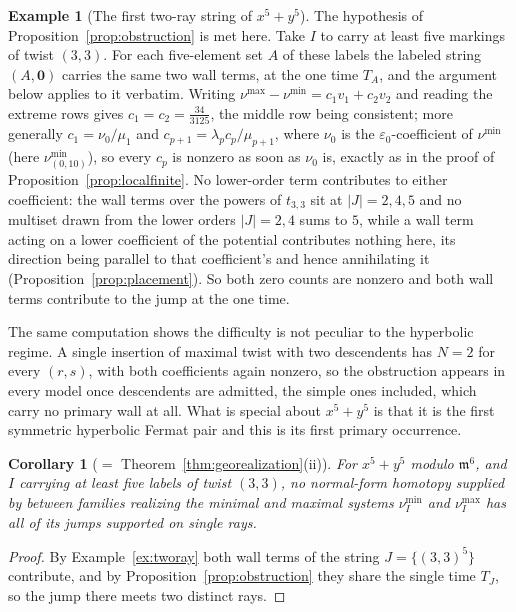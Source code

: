 \documentclass[11pt]{amsart}
\newtheorem{corollary}[theorem]{Corollary}
\theoremstyle{definition}
\newtheorem{example}[theorem]{Example}
\theoremstyle{remark}
\begin{document}
\begin{example}[The first two-ray string of $x^5+y^5$]
The hypothesis of Proposition~\ref{prop:obstruction} is met here. Take $I$ to carry
at least five markings of twist $(3,3)$.  For each five-element set $A$ of these
labels the labeled string $(A,\mathbf 0)$ carries the same two wall terms, at
the one time $T_A$, and the argument below applies to it verbatim. Writing
$\nu^{\max}-\nu^{\min}=c_{1}v_{1}+c_{2}v_{2}$ and reading the extreme rows gives
$c_{1}=c_{2}=\tfrac{34}{3125}$, the middle row being consistent; more generally
$c_{1}=\nu_{0}/\mu_{1}$ and $c_{p+1}=\lambda_{p}c_{p}/\mu_{p+1}$, where $\nu_0$ is
the $\varepsilon_0$-coefficient of $\nu^{\min}$ (here $\nu^{\min}_{(0,10)}$), so
every $c_{p}$ is nonzero as soon as $\nu_{0}$ is, exactly as in the proof of
Proposition~\ref{prop:localfinite}.
No lower-order term contributes to either coefficient: the wall terms over the
powers of $t_{3,3}$ sit at
$|J|=2,4,5$ and no multiset drawn from the lower orders $|J|=2,4$ sums to $5$, while a wall term acting on a lower
coefficient of the potential contributes nothing here, its direction being parallel to
that coefficient's and hence annihilating it (Proposition~\ref{prop:placement}). So both
zero counts are nonzero and both wall terms contribute to the jump at the one time.

The same computation shows the difficulty is not peculiar to the hyperbolic regime. A
single insertion of maximal twist with two descendents has $N=2$ for every $(r,s)$, with
both coefficients again nonzero, so the obstruction appears in every model once
descendents are admitted, the simple ones included, which carry no primary wall at
all. What is special about $x^{5}+y^{5}$ is that it is the first symmetric
hyperbolic Fermat pair and this is its first primary occurrence.
\end{example}

\begin{corollary}[$=$ Theorem~\ref{thm:georealization}(ii)]
\label{cor:nosimple}
For $x^{5}+y^{5}$ modulo $\mathfrak m^{6}$, and $I$ carrying at least five
labels of twist $(3,3)$, no normal-form homotopy supplied by
\cite[Lem.~3.40]{GKT} between families realizing the minimal and maximal
systems $\nu_I^{\min}$ and $\nu_I^{\max}$ has all of its jumps supported on single
rays.
\end{corollary}

\begin{proof}
By Example~\ref{ex:tworay} both wall terms of the string $J=\{(3,3)^{5}\}$ contribute,
and by Proposition~\ref{prop:obstruction} they share the single time $T_{J}$, so the
jump there meets two distinct rays.
\end{proof}
\end{document}
